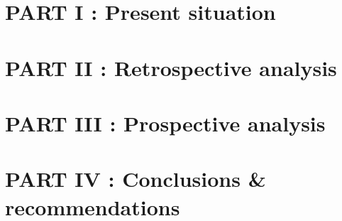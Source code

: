 \documentclass[12pt]{article}
\begin{document}
\newpage
\tableofcontents

\newpage
\section{PART I : Present situation}



\section{PART II : Retrospective analysis}



\section{PART III : Prospective analysis}



\section{PART IV : Conclusions \& recommendations}





\end{document}
